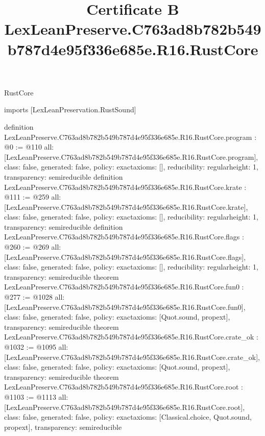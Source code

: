 \begin{lexlean}{RustCore}
\title{Certificate B LexLeanPreserve.C763ad8b782b549b787d4e95f336e685e.R16.RustCore}
\begin{coremodule}
imports [LexLeanPreservation.RustSound]

definition LexLeanPreserve.C763ad8b782b549b787d4e95f336e685e.R16.RustCore.program : @0 := @110 {
  all: [LexLeanPreserve.C763ad8b782b549b787d4e95f336e685e.R16.RustCore.program],
  class: false,
  generated: false,
  policy: exact{axioms: []},
  reducibility: regular{height: 1},
  transparency: semireducible
}
definition LexLeanPreserve.C763ad8b782b549b787d4e95f336e685e.R16.RustCore.krate : @111 := @259 {
  all: [LexLeanPreserve.C763ad8b782b549b787d4e95f336e685e.R16.RustCore.krate],
  class: false,
  generated: false,
  policy: exact{axioms: []},
  reducibility: regular{height: 1},
  transparency: semireducible
}
definition LexLeanPreserve.C763ad8b782b549b787d4e95f336e685e.R16.RustCore.flags : @260 := @269 {
  all: [LexLeanPreserve.C763ad8b782b549b787d4e95f336e685e.R16.RustCore.flags],
  class: false,
  generated: false,
  policy: exact{axioms: []},
  reducibility: regular{height: 1},
  transparency: semireducible
}
theorem LexLeanPreserve.C763ad8b782b549b787d4e95f336e685e.R16.RustCore.fun0 : @277 := @1028 {
  all: [LexLeanPreserve.C763ad8b782b549b787d4e95f336e685e.R16.RustCore.fun0],
  class: false,
  generated: false,
  policy: exact{axioms: [Quot.sound, propext]},
  transparency: semireducible
}
theorem LexLeanPreserve.C763ad8b782b549b787d4e95f336e685e.R16.RustCore.crate_ok : @1032 := @1095 {
  all: [LexLeanPreserve.C763ad8b782b549b787d4e95f336e685e.R16.RustCore.crate_ok],
  class: false,
  generated: false,
  policy: exact{axioms: [Quot.sound, propext]},
  transparency: semireducible
}
theorem LexLeanPreserve.C763ad8b782b549b787d4e95f336e685e.R16.RustCore.root : @1103 := @1113 {
  all: [LexLeanPreserve.C763ad8b782b549b787d4e95f336e685e.R16.RustCore.root],
  class: false,
  generated: false,
  policy: exact{axioms: [Classical.choice, Quot.sound, propext]},
  transparency: semireducible
}


\end{coremodule}
\end{lexlean}
